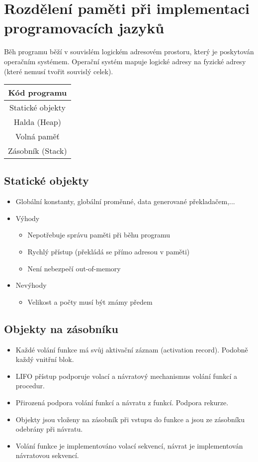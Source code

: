 \documentclass{szzclass}
\begin{document}
\tableofcontents
\newpage

\section{Rozdělení paměti při implementaci programovacích jazyků}
Běh programu běží v souvislém logickém adresovém prostoru, který je poskytován operačním systémem. Operační systém mapuje logické adresy na fyzické adresy (které nemusí tvořit souvislý celek).

\begin{center}
\def\arraystretch{2}
\begin{tabular}{|c|} \hline
Kód programu \\ \hline
Statické objekty \\ \hline
Halda (Heap) \\ \hline
Volná paměť \\ \hline
Zásobník (Stack) \\ \hline
\end{tabular}
\end{center}

\subsection{Statické objekty}
\begin{itemize}
\item Globální konstanty, globální proměnné, data generované překladačem,...
\item Výhody
  \begin{itemize}
  \item Nepotřebuje správu paměti při běhu programu
  \item Rychlý přístup (překládá se přímo adresou v paměti)
  \item Není nebezpečí out-of-memory
  \end{itemize}
\item Nevýhody
  \begin{itemize}
  \item Velikost a počty musí být známy předem
  \end{itemize}
\end{itemize}

\subsection{Objekty na zásobníku}
\begin{itemize}
\item Každé volání funkce má svůj aktivační záznam (activation record). Podobně každý vnitřní blok.
\item LIFO přístup podporuje volací a návratový mechanismus volání funkcí a procedur.
\item Přirozená podpora volání funkcí a návratu z funkcí. Podpora rekurze.
\item Objekty jsou vloženy na zásobník při vstupu do funkce a jsou ze zásobníku odebrány při návratu.
\item Volání funkce je implementováno volací sekvencí, návrat je implementován návratovou sekvencí.
\end{itemize}
\end{document}
